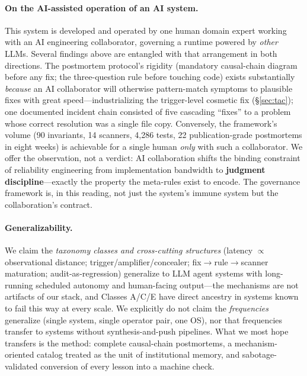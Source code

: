 \paragraph{On the AI-assisted operation of an AI system.}
This system is developed and operated by one human domain expert working
with an AI engineering collaborator, governing a runtime powered by
\emph{other} LLMs. Several findings above are entangled with that
arrangement in both directions. The postmortem protocol's rigidity
(mandatory causal-chain diagram before any fix; the three-question rule
before touching code) exists substantially \emph{because} an AI
collaborator will otherwise pattern-match symptoms to plausible fixes
with great speed---industrializing the trigger-level cosmetic fix
(\S\ref{sec:tac}); one documented incident chain consisted of five
cascading ``fixes'' to a problem whose correct resolution was a single
file copy. Conversely, the framework's volume (90 invariants, 14
scanners, 4{,}286 tests, 22 publication-grade postmortems in eight weeks)
is achievable for a single human \emph{only} with such a collaborator. We
offer the observation, not a verdict: AI collaboration shifts the binding
constraint of reliability engineering from implementation bandwidth to
\textbf{judgment discipline}---exactly the property the meta-rules exist
to encode. The governance framework is, in this reading, not just the
system's immune system but the collaboration's contract.

\paragraph{Generalizability.}
We claim the \emph{taxonomy classes and cross-cutting structures}
(latency $\propto$ observational distance; trigger/amplifier/concealer;
fix$\rightarrow$rule$\rightarrow$scanner maturation;
audit-as-regression) generalize to LLM agent systems with long-running
scheduled autonomy and human-facing output---the mechanisms are not
artifacts of our stack, and Classes A/C/E have direct ancestry in systems
known to fail this way at every scale. We explicitly do not claim the
\emph{frequencies} generalize (single system, single operator pair, one
OS), nor that  frequencies transfer to systems without
synthesis-and-push pipelines. What we most hope transfers is the method:
complete causal-chain postmortems, a mechanism-oriented catalog treated
as the unit of institutional memory, and sabotage-validated conversion of
every lesson into a machine check.
